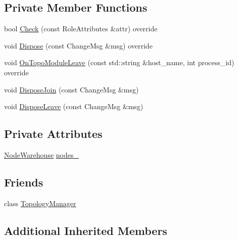 \subsection*{Private Member Functions}
\begin{DoxyCompactItemize}
\item 
bool \hyperlink{classapollo_1_1cyber_1_1service__discovery_1_1NodeManager_affa8f0c21cffc2ff647f6823acc928e2}{Check} (const Role\-Attributes \&attr) override
\item 
void \hyperlink{classapollo_1_1cyber_1_1service__discovery_1_1NodeManager_a908f3fca225735f0277f1a9801f71334}{Dispose} (const Change\-Msg \&msg) override
\item 
void \hyperlink{classapollo_1_1cyber_1_1service__discovery_1_1NodeManager_ae397dee1edf09f1c89bd546b36f6c3cf}{On\-Topo\-Module\-Leave} (const std\-::string \&host\-\_\-name, int process\-\_\-id) override
\item 
void \hyperlink{classapollo_1_1cyber_1_1service__discovery_1_1NodeManager_abfd94763b5059c77cfd761e53a2e7439}{Dispose\-Join} (const Change\-Msg \&msg)
\item 
void \hyperlink{classapollo_1_1cyber_1_1service__discovery_1_1NodeManager_accf089b16771c1d874c0293ce994f1cf}{Dispose\-Leave} (const Change\-Msg \&msg)
\end{DoxyCompactItemize}
\subsection*{Private Attributes}
\begin{DoxyCompactItemize}
\item 
\hyperlink{classapollo_1_1cyber_1_1service__discovery_1_1NodeManager_a3482319db4df86634ca8459c794c3d0e}{Node\-Warehouse} \hyperlink{classapollo_1_1cyber_1_1service__discovery_1_1NodeManager_a62b25f2a35068e34963f8faa0faa9509}{nodes\-\_\-}
\end{DoxyCompactItemize}
\subsection*{Friends}
\begin{DoxyCompactItemize}
\item 
class \hyperlink{classapollo_1_1cyber_1_1service__discovery_1_1NodeManager_ae83aaddaeb682129a07c148e01291cdd}{Topology\-Manager}
\end{DoxyCompactItemize}
\subsection*{Additional Inherited Members}


